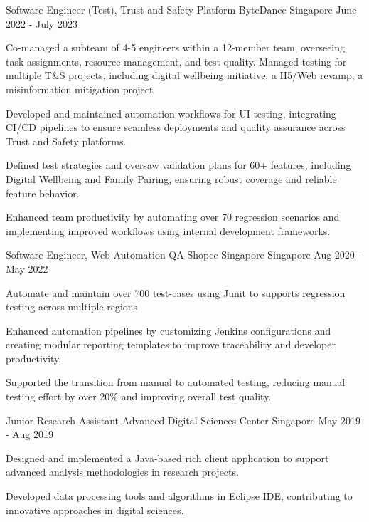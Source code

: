 \begin{cventries}
  \cventry
    {Software Engineer (Test), Trust and Safety Platform} %
    {ByteDance} %
    {Singapore} %
    {June 2022 - July 2023} %
    {
      \begin{cvitems}  
    \item {Co-managed a subteam of 4-5 engineers within a 12-member team, overseeing task assignments, resource management, and test quality. Managed testing for multiple T\&S projects, including digital wellbeing initiative, a H5/Web revamp, a misinformation mitigation project}
    \item {Developed and maintained automation workflows for UI testing, integrating CI/CD pipelines to ensure seamless deployments and quality assurance across Trust and Safety platforms.}
    \item {Defined test strategies and oversaw validation plans for 60+ features, including Digital Wellbeing and Family Pairing, ensuring robust coverage and reliable feature behavior.}
    \item {Enhanced team productivity by automating over 70 regression scenarios and implementing improved workflows using internal development frameworks.}
      \end{cvitems}
    }

  \cventry
    {Software Engineer, Web Automation QA} %
    {Shopee Singapore} %
    {Singapore} %
    {Aug 2020 - May 2022} %
    {
      \begin{cvitems} %
        \item {Automate and maintain over 700 test-cases using Junit to supports regression testing across multiple regions}
        \item {Enhanced automation pipelines by customizing Jenkins configurations and creating modular reporting templates to improve traceability and developer productivity.}
        \item {Supported the transition from manual to automated testing, reducing manual testing effort by over 20\% and improving overall test quality.}
      \end{cvitems}
    }
    
\vspace{0.2mm}

  \cventry
    {Junior Research Assistant } %
    {Advanced Digital Sciences Center} %
    {Singapore} %
    {May 2019 - Aug 2019} %
    {
      \begin{cvitems} %
        \item {Designed and implemented a Java-based rich client application to support advanced analysis methodologies in research projects.}
        \item {Developed data processing tools and algorithms in Eclipse IDE, contributing to innovative approaches in digital sciences.}
      \end{cvitems}
    }
    

\end{cventries}
